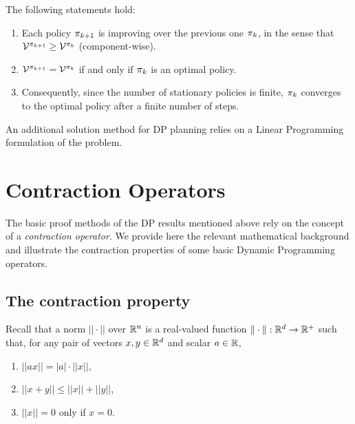 \begin{theorem}\label{thm:_PI}
The following statements hold:
\begin{enumerate}
  \item Each policy ${\pi _{k + 1}}$ is improving over the previous one ${\pi _k}$, in the sense that ${\mathcal{V}^{{\pi _{k + 1}}}} \ge {\mathcal{V}^{{\pi_k}}}$ (component-wise).
  \item ${\mathcal{V}^{{\pi _{k + 1}}}} = {\mathcal{V}^{{\pi _k}}}$ if and only if ${\pi _k}$ is an optimal policy.
  \item Consequently, since the number of stationary policies is finite, ${\pi _k}$ converges to the optimal policy after a finite number of steps.
\end{enumerate}
\end{theorem}

\begin{remark}
An additional solution method for DP planning relies on a Linear
Programming formulation of the problem.
\end{remark}

\section{Contraction Operators}

The basic proof methods of the DP results mentioned above rely on
the concept of a \emph{contraction operator}. We provide here the
relevant mathematical background and illustrate the contraction
properties of some basic Dynamic Programming operators.

\subsection{The contraction property}
Recall that a norm $|| \cdot ||$ over $\mathbb{R}^n$  is a real-valued
function $\|\cdot\| : \mathbb{R}^d \to \mathbb R^+$ such that, for any
pair of vectors $x,y \in \mathbb{R}^d$  and scalar $a\in\mathbb{R}$,
\begin{enumerate}
  \item $||ax|| = |a| \cdot ||x||$,
  \item $||x + y|| \le ||x|| + ||y||$,
  \item $||x|| = 0$ only if $x = 0$.
\end{enumerate}

